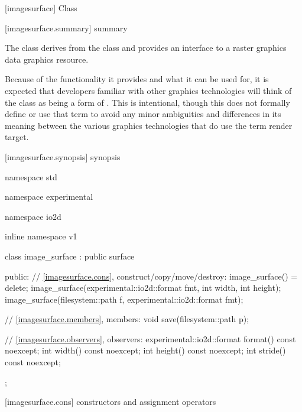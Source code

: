  [imagesurface] {Class }

 [imagesurface.summary] { summary}

\pnum
{}
The class  derives from the  class and provides an interface to a raster graphics data graphics resource.

\pnum
\enternote
Because of the functionality it provides and what it can be used for, it is expected that developers familiar with other graphics technologies will think of the  class as being a form of . This is intentional, though this \documenttypename{} does not formally define or use that term to avoid any minor ambiguities and differences in its meaning between the various graphics technologies that do use the term render target.
\exitnote

 [imagesurface.synopsis] { synopsis}

\begin{codeblock}
namespace std { namespace experimental { namespace io2d { inline namespace v1 {
  class image_surface : public surface {
  public:
    // \ref{imagesurface.cons}, construct/copy/move/destroy:
    image_surface() = delete;
    image_surface(experimental::io2d::format fmt, int width, int height);
    image_surface(filesystem::path f, experimental::io2d::format fmt);
    
    // \ref{imagesurface.members}, members:
    void save(filesystem::path p);
    
    // \ref{imagesurface.observers}, observers:
    experimental::io2d::format format() const noexcept;
    int width() const noexcept;
    int height() const noexcept;
    int stride() const noexcept;
  };
} } } }
\end{codeblock}

 [imagesurface.cons] { constructors and assignment operators}

